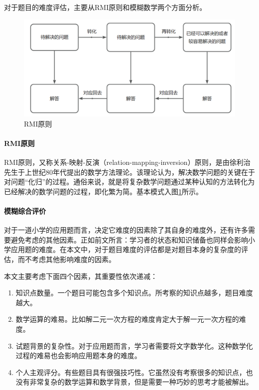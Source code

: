 对于题目的难度评估，主要从RMI原则和模糊数学两个方面分析。

\begin{figure}[h]
    \centering
    \includegraphics[scale=0.3]{res/figure040117.png}
    \caption{RMI原则}
    \label{figure040117}
\end{figure}

\paragraph{RMI原则}

RMI原则，又称关系-映射-反演（relation-mapping-inversion）原则，是由徐利治先生于上世纪80年代提出的数学方法理论\cite{zhangShuxueshitishiqiannandudeyingxiangyinsujiqilianghuayanjiu2022}。该理论认为，解决数学问题的关键在于对问题“化归”的过程。通俗来说，就是将复杂数学问题通过某种认知的方法转化为已经解决的数学问题的过程，即化繁为简。基本模式入图\ref{figure040117}所示。

\paragraph{模糊综合评价}

对于一道小学的应用题而言，决定它难度的因素除了其自身的难度外，还有许多需要避免考虑的其他因素。正如前文所言：学习者的状态和知识储备也同样会影响小学应用题的难度。在本文中，对于题目难度的评估都是对题目本身的复杂度的评估，而不考虑其他影响难度的因素。

本文主要考虑下面四个因素，其重要性依次递减：

\begin{enumerate}
    \item 知识点数量。一个题目可能包含多个知识点。所考察的知识点越多，题目难度越大。
    \item 数学运算的难易。比如解二元一次方程的难度肯定大于解一元一次方程的难度。
    \item 试题背景的复杂性。对于应用题而言，学习者需要将文字数学化。这种数学化过程的难易也会影响应用题本身的难度。
    \item 个人主观评分。有些题目具有很强技巧性。它虽然没有考察很多的知识点，也没有非常复杂的数学运算和数学背景，但是需要一种巧妙的思考才能被解出。
\end{enumerate}

